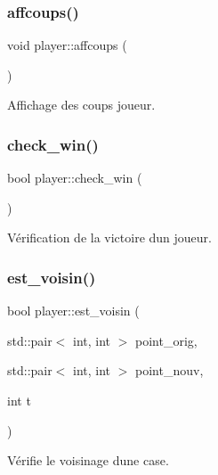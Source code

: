 \subsubsection{\texorpdfstring{affcoups()}{affcoups()}}
{\footnotesize\ttfamily void player\+::affcoups (\begin{DoxyParamCaption}{ }\end{DoxyParamCaption})}



Affichage des coups joueur. 

\mbox{\label{classplayer_a5eddf905f6904f5737b4f36f7f0ab428}} 
\subsubsection{\texorpdfstring{check\+\_\+win()}{check\_win()}}
{\footnotesize\ttfamily bool player\+::check\+\_\+win (\begin{DoxyParamCaption}{ }\end{DoxyParamCaption})}



Vérification de la victoire d\textquotesingle{}un joueur. 

\mbox{\label{classplayer_a24a75aa099e5a4eac97d3898fde40a3b}} 
\subsubsection{\texorpdfstring{est\+\_\+voisin()}{est\_voisin()}}
{\footnotesize\ttfamily bool player\+::est\+\_\+voisin (\begin{DoxyParamCaption}\item[{std\+::pair$<$ int, int $>$}]{point\+\_\+orig,  }\item[{std\+::pair$<$ int, int $>$}]{point\+\_\+nouv,  }\item[{int}]{t }\end{DoxyParamCaption})}



Vérifie le voisinage d\textquotesingle{}une case. 

